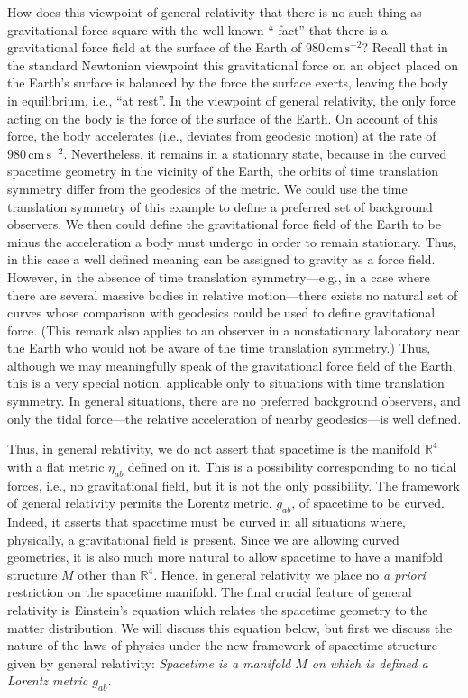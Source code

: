 How does this viewpoint of general relativity that there is no such thing as
gravitational force square with the well known \textquotedblleft
fact\textquotedblright{} that there is a gravitational force field at the surface of
the Earth of \(980\,\mathrm{cm\,s^{-2}}\)? Recall that in the standard Newtonian
viewpoint this gravitational force on an object placed on the Earth's surface is
balanced by the force the surface exerts, leaving the body in equilibrium, i.e.,
\textquotedblleft at rest\textquotedblright. In the viewpoint of general relativity,
the only force acting on the body is the force of the surface of the Earth. On
account of this force, the body accelerates (i.e., deviates from geodesic motion) at
the rate of \(980\,\mathrm{cm\,s^{-2}}\). Nevertheless, it remains in a stationary
state, because in the curved spacetime geometry in the vicinity of the Earth, the
orbits of time translation symmetry differ from the geodesics of the metric. We
could use the time translation symmetry of this example to define a preferred set of
background observers. We then could define the gravitational force field of the
Earth to be minus the acceleration a body must undergo in order to remain
stationary. Thus, in this case a well defined meaning can be assigned to gravity as a
force field. However, in the absence of time translation symmetry---e.g., in a case
where there are several massive bodies in relative motion---there exists no natural
set of curves whose comparison with geodesics could be used to define
gravitational force. (This remark also applies to an observer in a nonstationary
laboratory near the Earth who would not be aware of the time translation
symmetry.) Thus, although we may meaningfully speak of the gravitational force
field of the Earth, this is a very special notion, applicable only to situations with
time translation symmetry. In general situations, there are no preferred
background observers, and only the tidal force---the relative acceleration of nearby
geodesics---is well defined.

Thus, in general relativity, we do not assert that spacetime is the manifold
\(\mathbb R^4\) with a flat metric \(\eta_{ab}\) defined on it. This is a
possibility corresponding to no tidal forces, i.e., no gravitational field, but it is
not the only possibility. The framework of general relativity permits the Lorentz
metric, \(g_{ab}\), of spacetime to be curved. Indeed, it asserts that spacetime
must be curved in all situations where, physically, a gravitational field is present.
Since we are allowing curved geometries, it is also much more natural to allow
spacetime to have a manifold structure \(M\) other than \(\mathbb R^4\). Hence,
in general relativity we place no \emph{a priori} restriction on the spacetime
manifold. The final crucial feature of general relativity is Einstein's equation
which relates the spacetime geometry to the matter distribution. We will discuss
this equation below, but first we discuss the nature of the laws of physics under the
new framework of spacetime structure given by general relativity:
\emph{Spacetime is a manifold \(M\) on which is defined a Lorentz metric
\(g_{ab}\).}

